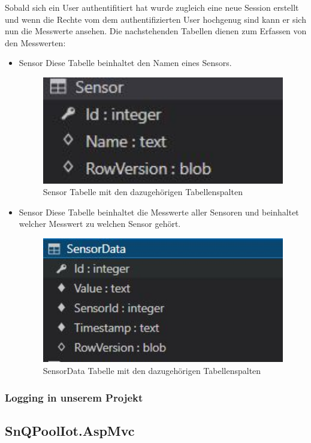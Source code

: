 Sobald sich ein User authentifitiert hat wurde zugleich eine neue Session erstellt und wenn die Rechte vom
dem authentifizierten User hochgenug sind kann er sich nun die Messwerte ansehen.
Die nachstehenden Tabellen dienen zum Erfassen von den Messwerten:

\begin{itemize}
    \item Sensor
    Diese Tabelle beinhaltet den Namen eines Sensors.
    \begin{figure}[H]
        \centering
        \includegraphics[width=1\textwidth]{pics/SensorTableStructure.JPG}
        \caption{Sensor Tabelle mit den dazugehörigen Tabellenspalten}
    \end{figure}
\end{itemize}

\begin{itemize}
    \item Sensor
    Diese Tabelle beinhaltet die Messwerte aller Sensoren und beinhaltet welcher Messwert zu welchen Sensor gehört.
    \begin{figure}[H]
        \centering
        \includegraphics[width=1\textwidth]{pics/SensorDataTableStructure.JPG}
        \caption{SensorData Tabelle mit den dazugehörigen Tabellenspalten}
    \end{figure}
\end{itemize}


\subsubsection*{Logging in unserem Projekt}


\subsection{SnQPoolIot.AspMvc}

